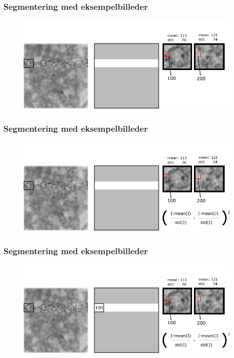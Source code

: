 \documentclass[12pt,t]{beamer}
\begin{document}
\begin{frame}
\frametitle{Segmentering med eksempelbilleder}
\begin{figure}[H]
\includegraphics[scale=0.35]{img/afstand/7.png}
\end{figure}
\end{frame}


\begin{frame}
\frametitle{Segmentering med eksempelbilleder}
\begin{figure}[H]
\includegraphics[scale=0.35]{img/afstand/8.png}
\end{figure}
\end{frame}

\begin{frame}
\frametitle{Segmentering med eksempelbilleder}
\begin{figure}[H]
\includegraphics[scale=0.35]{img/afstand/9.png}
\end{figure}
\end{frame}
\end{document}
